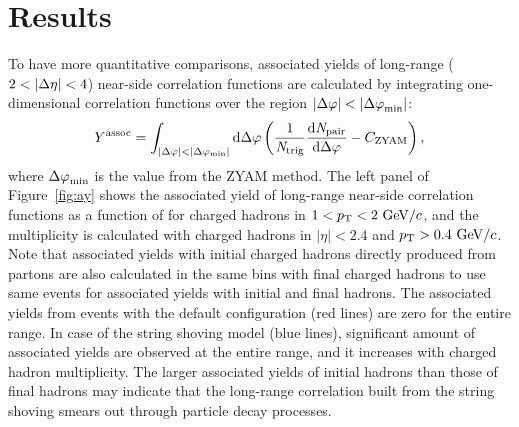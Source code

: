 
\section{Results} %
\label{sec:results}

To have more quantitative comparisons, associated yields of long-range ($2<|\deta|<4$) near-side correlation functions are calculated by integrating one-dimensional correlation functions over the region $|\dphi|<|\dphi_{\rm{min}}|$:
\begin{equation}
   Y^{\rm{assoc}} = \int_{|\Delta \varphi| < |\Delta \varphi_{\mathrm{min}}| } \mathrm{d} \Delta\varphi \left( \frac{1}{\it{N}_{\rm{trig}}} \frac{ \rm{d}\it{}N_{\rm{pair}} }{ \mathrm{d}\Delta\varphi } - C_{\rm{ZYAM}} \right), 
\end{equation}
where $\mbox{$\Delta\varphi$}_\mathrm{min}$ is the \dphi value from the ZYAM method. 
The left panel of Figure~\ref{fig:ay} shows the associated yield of long-range near-side correlation functions as a function of \Nch for charged hadrons in $1<\mbox{$p_{\mathrm{T}}$}<2~\mathrm{GeV}/c$, and the multiplicity \Nch is calculated with charged hadrons in $|\eta|<2.4$ and $\mbox{$p_{\mathrm{T}}$}>0.4~\mathrm{GeV}/c$.
Note that associated yields with initial charged hadrons directly produced from partons are also calculated in the same \Nch bins with final charged hadrons to use same events for associated yields with initial and final hadrons.
The associated yields from \pythia events with the default configuration (red lines) are zero for the entire \Nch range. 
In case of the string shoving model (blue lines), significant amount of associated yields are observed at the entire \Nch range, and it increases with charged hadron multiplicity.
The larger associated yields of initial hadrons than those of final hadrons may indicate that the long-range correlation built from the string shoving smears out through particle decay processes.

